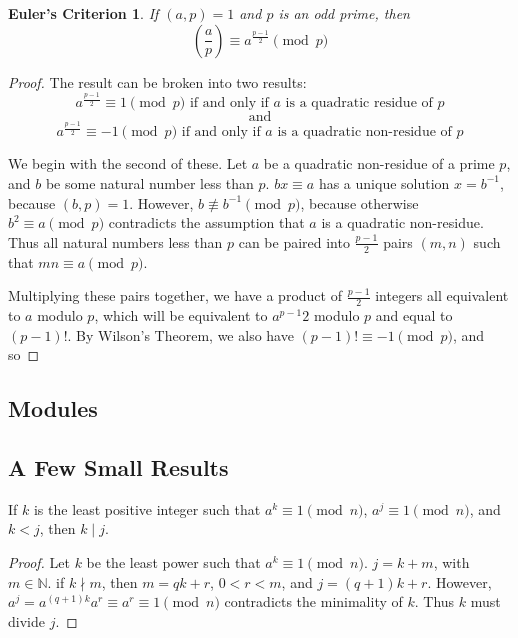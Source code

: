 \documentclass{article}
\theoremstyle{plain}
\begin{document}
\newtheorem*{eulercriterion}{Euler's Criterion}
\begin{eulercriterion}
If $(a,p)  = 1$ and $p$ is an odd prime, then 
	$$ \left( \frac{a}{p} \right)  \equiv a^{\frac{p-1}{2}} \pmod p$$
\end{eulercriterion}
\begin{proof}
The result can be broken into two results:
	$$a^{\frac{p-1}{2}} \equiv 1 \pmod p \text{ if and only if } a \text{ is a quadratic residue of } p$$
	$$\text{ and }$$
	$$a^{\frac{p-1}{2}} \equiv -1 \pmod p \text{ if and only if } a \text{ is a quadratic non-residue of } p$$
	
\par We begin with the second of these. Let $a$ be a quadratic non-residue of a prime $p$, and $b$ be some natural number less than $p$. $bx \equiv a$ has a unique solution $x = b^{-1}$, because $(b,p) = 1$. However, $b \not \equiv b^{-1} \pmod p$, because otherwise $b^2 \equiv a \pmod p$ contradicts the assumption that $a$ is a quadratic non-residue. Thus all natural numbers less than $p$ can be paired into $\frac{p-1}{2}$ pairs $(m,n)$ such that $mn \equiv a \pmod p$. 
\par Multiplying these pairs together, we have a product of  $\frac{p-1}{2}$ integers all equivalent to $a$ modulo $p$, which will be equivalent to $a^{p-1}{2}$ modulo $p$ and  equal to $(p-1)!$. By Wilson's Theorem, we also have $(p-1)! \equiv -1 \pmod p$, and so 
\end{proof}

\subsection{Modules}

\subsection{A Few Small Results}
\begin{theorem}
If $k$ is the least positive integer such that $a^k \equiv 1 \pmod n$, $a^j \equiv 1 \pmod n$, and $k < j$, then $k \mid j$.
\end{theorem}
\begin{proof}
Let $k$ be the least power such that $a^k \equiv 1 \pmod n$. $j = k + m$, with $m \in \mathbb N$. if $k \nmid m$, then $m = qk+ r$, $ 0 < r < m$, and $j = (q+1)k + r$. However, $a^j = a^{(q+1)k}a^r \equiv a^r \equiv 1 \pmod n$ contradicts the minimality of $k$. Thus $k$ must divide $j$.
\end{proof}
\end{document}
